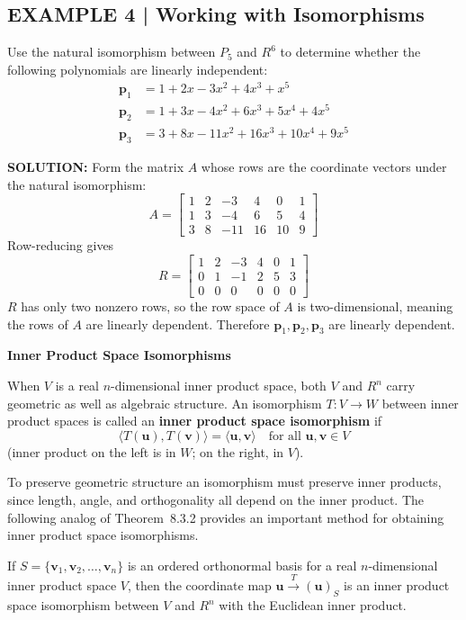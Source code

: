\documentclass{article}
\newcommand{\redheading}[1]{{\vspace{2mm}\noindent\Large\bfseries\color{red!55!black} #1\par}\vspace{2mm}}
\begin{document}
\subsection*{EXAMPLE 4 | Working with Isomorphisms}

Use the natural isomorphism between $P_5$ and $R^6$ to determine whether the following
polynomials are linearly independent:
\begin{align*}
  \mathbf{p}_1 &= 1 + 2x - 3x^2 + 4x^3 + x^5\\
  \mathbf{p}_2 &= 1 + 3x - 4x^2 + 6x^3 + 5x^4 + 4x^5\\
  \mathbf{p}_3 &= 3 + 8x - 11x^2 + 16x^3 + 10x^4 + 9x^5
\end{align*}

\textbf{SOLUTION:} Form the matrix $A$ whose rows are the coordinate vectors under the
natural isomorphism:
\[
  A = \begin{bmatrix}1&2&-3&4&0&1\\1&3&-4&6&5&4\\3&8&-11&16&10&9\end{bmatrix}
\]
Row-reducing gives
\[
  R = \begin{bmatrix}1&2&-3&4&0&1\\0&1&-1&2&5&3\\0&0&0&0&0&0\end{bmatrix}
\]
$R$ has only two nonzero rows, so the row space of $A$ is two-dimensional, meaning the
rows of $A$ are linearly dependent. Therefore $\mathbf{p}_1, \mathbf{p}_2, \mathbf{p}_3$
are linearly dependent.

\vspace{2mm}

\redheading{Inner Product Space Isomorphisms}

When $V$ is a real $n$-dimensional inner product space, both $V$ and $R^n$ carry geometric
as well as algebraic structure. An isomorphism $T : V \to W$ between inner product spaces
is called an \textbf{inner product space isomorphism} if
\[
  \langle T(\mathbf{u}), T(\mathbf{v})\rangle = \langle \mathbf{u}, \mathbf{v}\rangle
  \quad\text{for all } \mathbf{u},\mathbf{v}\in V
\]
(inner product on the left is in $W$; on the right, in $V$).

To preserve geometric structure an isomorphism must preserve inner products, since length,
angle, and orthogonality all depend on the inner product. The following analog of
Theorem~8.3.2 provides an important method for obtaining inner product space isomorphisms.

\begin{tcolorbox}[colback=red!4, colframe=red!60!black,
  title={\textbf{Theorem 8.3.3}}, boxrule=0.5mm, arc=3mm]
If $S = \{\mathbf{v}_1, \mathbf{v}_2, \ldots, \mathbf{v}_n\}$ is an ordered orthonormal
basis for a real $n$-dimensional inner product space $V$, then the coordinate map
$\mathbf{u} \xrightarrow{T} (\mathbf{u})_S$ is an inner product space isomorphism between
$V$ and $R^n$ with the Euclidean inner product.
\end{tcolorbox}
\end{document}
